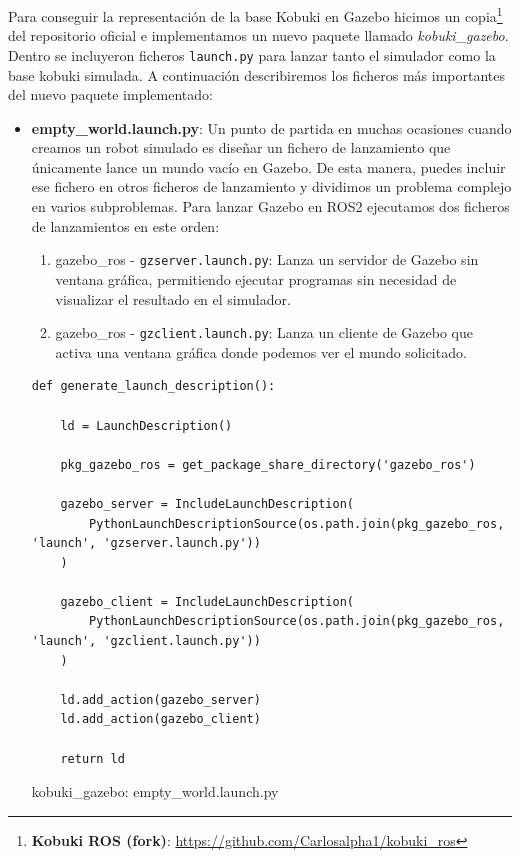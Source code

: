 Para conseguir la representación de la base Kobuki en Gazebo hicimos un copia\footnote{\textbf{Kobuki ROS (fork)}: \url{https://github.com/Carlosalpha1/kobuki_ros}} del repositorio oficial e implementamos un nuevo paquete llamado \textit{kobuki\_gazebo}. Dentro se incluyeron ficheros \texttt{launch.py} para lanzar tanto el simulador como la base kobuki simulada. A continuación describiremos los ficheros más importantes del nuevo paquete implementado:

\begin{itemize}
	\item \textbf{empty\_world.launch.py}: Un punto de partida en muchas ocasiones cuando creamos un robot simulado es diseñar un fichero de lanzamiento que únicamente lance un mundo vacío en Gazebo. De esta manera, puedes incluir ese fichero en otros ficheros de lanzamiento y dividimos un problema complejo en varios subproblemas. Para lanzar Gazebo en ROS2 ejecutamos dos ficheros de lanzamientos en este orden:
	\begin{enumerate}
		\item gazebo\_ros - \texttt{gzserver.launch.py}: Lanza un servidor de Gazebo sin ventana gráfica, permitiendo ejecutar programas sin necesidad de visualizar el resultado en el simulador.
		\item gazebo\_ros - \texttt{gzclient.launch.py}: Lanza un cliente de Gazebo que activa una ventana gráfica donde podemos ver el mundo solicitado.
	\end{enumerate}

\begin{code}[H]
\begin{lstlisting}[frame=single]
def generate_launch_description():

	ld = LaunchDescription()

	pkg_gazebo_ros = get_package_share_directory('gazebo_ros')
		
	gazebo_server = IncludeLaunchDescription(
		PythonLaunchDescriptionSource(os.path.join(pkg_gazebo_ros, 'launch', 'gzserver.launch.py'))
	)
		
	gazebo_client = IncludeLaunchDescription(
		PythonLaunchDescriptionSource(os.path.join(pkg_gazebo_ros, 'launch', 'gzclient.launch.py'))
	)
	
	ld.add_action(gazebo_server)
	ld.add_action(gazebo_client)
	
	return ld
\end{lstlisting}
\caption[kobuki\_gazebo: empty\_world.launch.py]{kobuki\_gazebo: empty\_world.launch.py}
\label{cod:kobuki_gazebo_empty_world}
\end{code}


\end{itemize}
